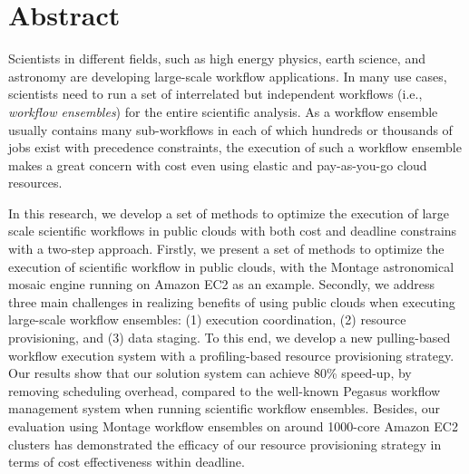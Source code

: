 \chapter*{Abstract}

Scientists in different fields, such as high energy physics, earth science, and astronomy are developing large-scale workflow applications. In many use cases, scientists need to run a set of interrelated but independent workflows (i.e., \emph{workflow ensembles}) for the entire scientific analysis. 
As a workflow ensemble usually contains many sub-workflows in each of which hundreds or thousands of jobs exist with precedence constraints, the execution of such a workflow ensemble makes a great concern with cost even using elastic and pay-as-you-go cloud resources.

In this research, we develop a set of methods to optimize the execution of large scale scientific workflows in public clouds with both cost and deadline constrains with a two-step approach. Firstly, we present a set of methods to optimize the execution of scientific workflow in public clouds, with the Montage astronomical mosaic engine running on Amazon EC2 as an example. Secondly, we address three main challenges in realizing benefits of using public clouds when executing large-scale workflow ensembles: (1) execution coordination, (2) resource provisioning, and (3) data staging. To this end, we develop a new pulling-based workflow execution system with a profiling-based resource provisioning strategy. Our results show that our solution system can achieve 80\% speed-up, by removing scheduling overhead, compared to the well-known Pegasus workflow management system when running scientific workflow ensembles. Besides, our evaluation using Montage workflow ensembles on around 1000-core Amazon EC2 clusters has demonstrated the efficacy of our resource provisioning strategy in terms of cost effectiveness within deadline. 


